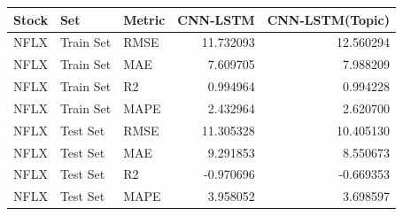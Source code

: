 \begin{tabular}{lllrr}
\toprule
Stock & Set & Metric & CNN-LSTM & CNN-LSTM(Topic) \\
\midrule
NFLX & Train Set & RMSE & 11.732093 & 12.560294 \\
NFLX & Train Set & MAE & 7.609705 & 7.988209 \\
NFLX & Train Set & R2 & 0.994964 & 0.994228 \\
NFLX & Train Set & MAPE & 2.432964 & 2.620700 \\
NFLX & Test Set & RMSE & 11.305328 & 10.405130 \\
NFLX & Test Set & MAE & 9.291853 & 8.550673 \\
NFLX & Test Set & R2 & -0.970696 & -0.669353 \\
NFLX & Test Set & MAPE & 3.958052 & 3.698597 \\
\bottomrule
\end{tabular}
